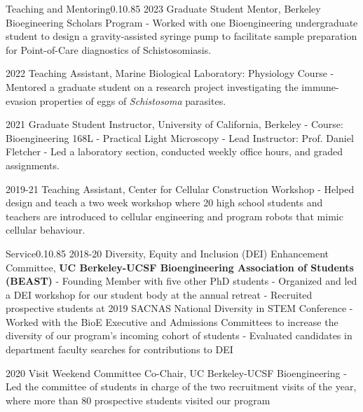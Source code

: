 \documentclass{federico_cv}
\begin{document}
\begin{tblSection}{Teaching and Mentoring}{0.1}{0.85}
\leftbfrightsingle
{2023}
{Graduate Student Mentor, Berkeley Bioegineering Scholars Program}
{- Worked with one Bioengineering undergraduate student to design a gravity-assisted syringe pump to facilitate sample preparation for Point-of-Care diagnostics of Schistosomiasis.}

\leftbfrightsingle
{2022}
{Teaching Assistant, Marine Biological Laboratory: Physiology Course}
{- Mentored a graduate student on a research project investigating the immune-evasion properties of eggs of \textit{Schistosoma} parasites.}


\leftbfrightsingle
{2021}
{Graduate Student Instructor, University of California, Berkeley}
{- Course: Bioengineering 168L - Practical Light Microscopy}
{- Lead Instructor: Prof. Daniel Fletcher}
{- Led a laboratory section, conducted weekly office hours, and graded assignments.}

\leftbfrightsingle
{2019-21}
{Teaching Assistant, Center for Cellular Construction Workshop}
{- Helped design and teach a two week workshop where 20 high school students and teachers are introduced to cellular engineering and program robots that mimic cellular behaviour.}

\end{tblSection}


\begin{tblSection}{Service}{0.1}{0.85}
\leftbfrightsingle
{2018-20}
{Diversity, Equity and Inclusion (DEI) Enhancement Committee,}
{\textbf{UC Berkeley-UCSF Bioengineering Association of Students (BEAST)}}
{- Founding Member with five other PhD students}
{- Organized and led a DEI workshop for our student body at the annual retreat}
{- Recruited prospective students at 2019 SACNAS National Diversity in STEM Conference}
{- Worked with the BioE Executive and Admissions Committees to increase the diversity of our program's incoming cohort of students}
{- Evaluated candidates in department faculty searches for contributions to DEI}

\leftbfrightsingle
{2020}
{Visit Weekend Committee Co-Chair, UC Berkeley-UCSF Bioengineering}
{- Led the committee of students in charge of the two recruitment visits of the year, where more than 80 prospective students visited our program}

\end{tblSection}
\end{document}
